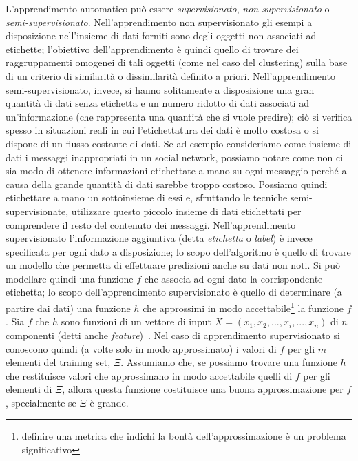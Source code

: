 \documentclass[oneside, openany]{book}
\begin{document}
		L'apprendimento automatico può essere \textit{supervisionato}, \textit{non supervisionato} o \textit{semi-supervisionato}. Nell'apprendimento non supervisionato gli esempi a disposizione nell'insieme di dati forniti sono degli oggetti non associati ad etichette; l'obiettivo dell'apprendimento è quindi quello di trovare dei raggruppamenti omogenei di tali oggetti (come nel caso del clustering) sulla base di un criterio di similarità o dissimilarità definito a priori. Nell'apprendimento semi-supervisionato, invece, si hanno solitamente a disposizione una gran quantità di dati senza etichetta e un numero ridotto di dati associati ad un'informazione (che rappresenta una quantità che si vuole predire); ciò si verifica spesso in situazioni reali in cui l’etichettatura dei dati è molto costosa o si dispone di un flusso costante di dati. Se ad esempio consideriamo come insieme di dati i messaggi inappropriati in un social network, possiamo notare come non ci sia modo di ottenere informazioni etichettate a mano su ogni messaggio perché a causa della grande quantità di dati sarebbe troppo costoso. Possiamo quindi etichettare a mano un sottoinsieme di essi e, sfruttando le tecniche semi-supervisionate, utilizzare questo piccolo insieme di dati etichettati per comprendere il resto del contenuto dei messaggi.\newline
		Nell'apprendimento supervisionato l'informazione aggiuntiva (detta \textit{etichetta} o \textit{label}) è invece specificata per ogni dato a disposizione; lo scopo dell'algoritmo è quello di trovare un modello che permetta di effettuare predizioni anche su dati non noti.
		Si può modellare quindi una funzione $f$ che associa ad ogni dato la corrispondente etichetta; lo scopo dell'apprendimento supervisionato è quello di determinare (a partire dai dati) una funzione $h$ che approssimi in modo accettabile\footnote{definire una metrica che indichi la bontà dell'approssimazione è un problema significativo} la funzione $f$. Sia $f$ che $h$ sono funzioni di un vettore di input $X=(x_1,x_2,...,x_i,...,x_n)$ di $n$ componenti (detti anche \textit{feature})~\cite{bib:ml}.
		Nel caso di apprendimento supervisionato si conoscono quindi (a volte solo in modo approssimato) i valori di $f$ per gli $m$ elementi del training set, $\Xi$. Assumiamo che, se possiamo trovare una funzione $h$ che restituisce valori che approssimano in modo accettabile quelli di $f$ per gli elementi di $\Xi$, allora questa funzione costituisce una buona approssimazione per $f$, specialmente se $\Xi$ è grande.
		
\end{document}

